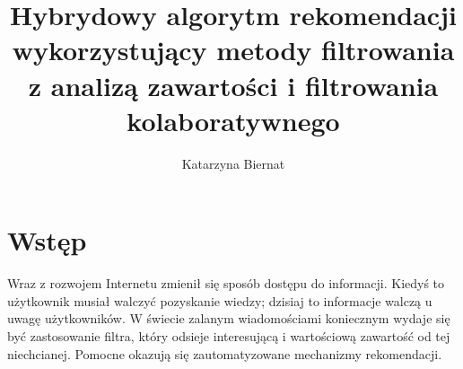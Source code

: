 \documentclass[twoside]{iisthesis}
\newcommand{\myfigure}[1]{%
\addcontentsline{figu}{myfigure}{\protect\numberline{\thefigure}#1}\par}
\begin{document}
\newcommand{\resultChart}[7][140]{
\def\dataS{{#2}}
	\begin{figure}[H]
	
\centering

\begin{center}
\begin{tikzpicture}
 
\begin{axis}[
ybar,
bar width=20,
legend style={at={(0.5,-0.25)},
anchor=north,legend columns=-1},
ylabel={Wartość miary},
symbolic x coords={\dataS},
xtick=data,
height=  {#1},
width=0.8\textwidth,
ymin=0, ytick={0,0.5,1},
ymax=1.5,
nodes near coords,
nodes near coords align={vertical},
]
\addplot coordinates { (\dataS,{#3}) };
\addplot coordinates {(\dataS,{#4}) };
\addplot coordinates { (\dataS,{#5}) };
\legend{Recall,Precission,F1-Score}
\end{axis}
\end{tikzpicture}
\end{center}
\caption{{#6}}
\myfigure{{#6}}
\label{{#7}}
\end{figure}
}


%
\nocite{*}
\title{ Hybrydowy algorytm rekomendacji wykorzystujący metody filtrowania z analizą zawartości i filtrowania kolaboratywnego }
\author{Katarzyna Biernat }

\date{\number\the\year}




\maketitle
\textpages


\graphicspath{ {img/} }

  \listoftodos


 \chapter{Wstęp}
	 Wraz z rozwojem Internetu zmienił się sposób dostępu do informacji. Kiedyś to użytkownik musiał walczyć pozyskanie wiedzy; dzisiaj to informacje walczą u uwagę użytkowników. W świecie zalanym wiadomościami koniecznym wydaje się być zastosowanie filtra, który odsieje interesującą  i wartościową zawartość od tej niechcianej. Pomocne okazują się zautomatyzowane mechanizmy rekomendacji.
	 
\end{document}
